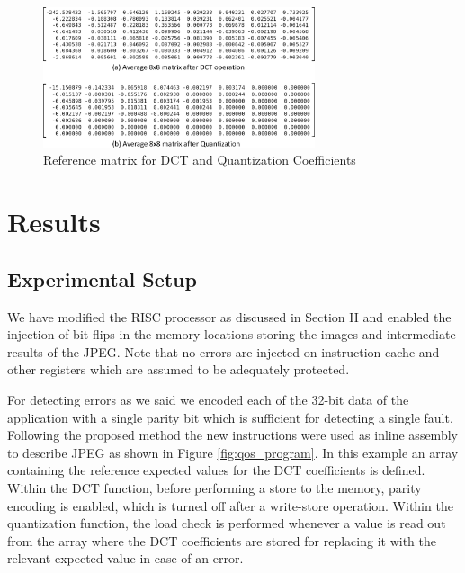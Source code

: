\begin{figure}
\centering
\includegraphics[width=80mm]{./eps/qos_matrix}
\caption{Reference matrix for DCT and Quantization Coefficients}
\vspace{-4mm}
\label{fig:qos_matrix}
\end{figure}


\section{Results} \label{sec:exp}

\subsection{Experimental Setup}
We have modified the RISC processor as discussed in Section II and enabled the injection of bit flips in the memory
locations storing the images and intermediate results of the JPEG. Note that no errors are injected on instruction cache and other registers which are assumed to be adequately protected.     

For detecting errors as we said we encoded each of the 32-bit data of the application with a single parity bit which is sufficient for detecting a single fault. Following the proposed method the new instructions were used as inline assembly to describe JPEG as shown in Figure \ref{fig:qos_program}.  In this example an array containing the reference expected values for the DCT coefficients is defined. 
Within the DCT function, before performing a store to the memory, parity encoding is enabled, which is turned off after a write-store operation. Within the quantization function, the load check is performed whenever a value is read out from the array where the DCT coefficients are stored for replacing it with the relevant expected value in case of an error.


